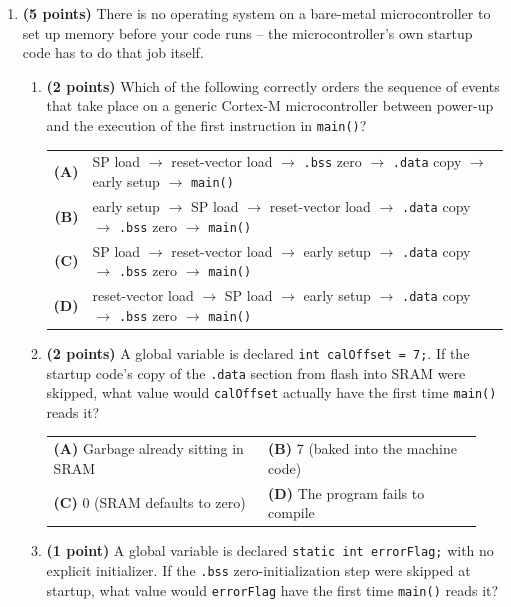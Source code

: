 \documentclass[10pt]{article}
\makeatletter
\newcommand{\mcfour}[4]{%
\begin{center}
\begin{tabular}{@{}p{0.47\linewidth}@{\hspace{0.04\linewidth}}p{0.47\linewidth}@{}}
#1 & #2 \\[3pt]
#3 & #4 \\
\end{tabular}
\end{center}}
\makeatother
\begin{document}
\begin{enumerate}[label=\textbf{\arabic*.}, leftmargin=*, itemsep=3pt]

\item \textbf{(5 points)} There is no operating system on a bare-metal microcontroller to set up memory before your code runs -- the microcontroller's own startup code has to do that job itself.

\begin{enumerate}[label=(\alph*), leftmargin=*, itemsep=3pt]
\item \textbf{(2 points)} Which of the following correctly orders the sequence of events that take place on a generic Cortex-M microcontroller between power-up and the execution of the first instruction in \texttt{main()}?

\begin{center}
\begin{tabular}{@{}rl@{}}
\textbf{(A)} & SP load $\rightarrow$ reset-vector load $\rightarrow$ \texttt{.bss} zero $\rightarrow$ \texttt{.data} copy $\rightarrow$ early setup $\rightarrow$ \texttt{main()} \\
\textbf{(B)} & early setup $\rightarrow$ SP load $\rightarrow$ reset-vector load $\rightarrow$ \texttt{.data} copy $\rightarrow$ \texttt{.bss} zero $\rightarrow$ \texttt{main()} \\
\textbf{(C)} & SP load $\rightarrow$ reset-vector load $\rightarrow$ early setup $\rightarrow$ \texttt{.data} copy $\rightarrow$ \texttt{.bss} zero $\rightarrow$ \texttt{main()} \\
\textbf{(D)} & reset-vector load $\rightarrow$ SP load $\rightarrow$ early setup $\rightarrow$ \texttt{.data} copy $\rightarrow$ \texttt{.bss} zero $\rightarrow$ \texttt{main()} \\
\end{tabular}
\end{center}

\item \textbf{(2 points)} A global variable is declared \texttt{int calOffset = 7;}. If the startup code's copy of the \texttt{.data} section from flash into SRAM were skipped, what value would \texttt{calOffset} actually have the first time \texttt{main()} reads it?

\mcfour{\textbf{(A)} Garbage already sitting in SRAM}{\textbf{(B)} 7 (baked into the machine code)}{\textbf{(C)} 0 (SRAM defaults to zero)}{\textbf{(D)} The program fails to compile}

\item \textbf{(1 point)} A global variable is declared \texttt{static int errorFlag;} with no explicit initializer. If the \texttt{.bss} zero-initialization step were skipped at startup, what value would \texttt{errorFlag} have the first time \texttt{main()} reads it?


\end{enumerate}
\end{enumerate}
\end{document}
